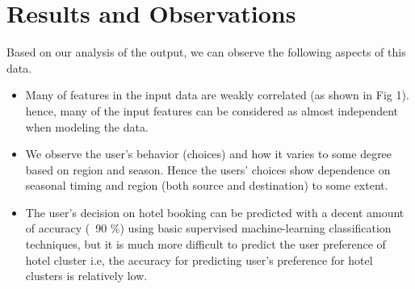 \documentclass[conference]{IEEEtran}
\begin{document}

\section{\textbf{Results and Observations}}
Based on our analysis of the output, we can observe the following aspects of this data.
\begin{itemize}
\item Many of features in the input data are weakly correlated (as shown in Fig 1). hence, many of the input features can be considered as almost independent when modeling the data.
\item We observe the user's behavior (choices) and how it varies to some degree based on region and season. Hence the users' choices show dependence on seasonal timing and region (both source and destination) to some extent.
\item The user's decision on hotel booking can be predicted with a decent amount of accuracy (~90 \%) using basic supervised machine-learning classification techniques, but it is much more difficult to predict the user preference of hotel cluster i.e, the accuracy for predicting user's preference for hotel clusters is relatively low.
\end{itemize}
 
\end{document}
